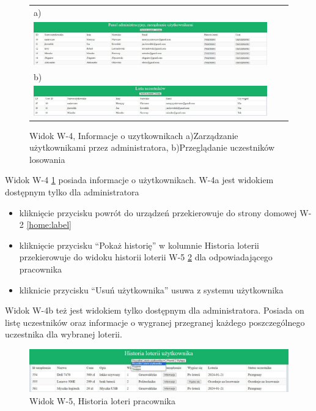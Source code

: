 \begin{figure}[htb]
  \centering
	\begin{tabular}{@{}lll@{}}
	a)\\
  \includegraphics[width=\textwidth]{rys05/view/manageUsers.pdf} \\
	
	b)\\
	\includegraphics[width=\textwidth]{rys05/view/participation.pdf} \\
	
	\end{tabular}
  \caption{Widok W-4, Informacje o uzytkownikach a)Zarządzanie użytkownikami przez administratora, b)Przeglądanie uczestników losowania}
  \label{manageUsers:label}
\end{figure}


Widok W-4 \ref{manageUsers:label} posiada informacje o użytkownikach. W-4a jest widokiem dostępnym tylko dla administratora
\begin{itemize}
	\item kliknięcie przycisku powrót do urządzeń przekierowuje do strony domowej W-2 \ref{home:label}
	\item kliknięcie przycisku "`Pokaż historię"' w kolumnie Historia loterii przekierowuje do widoku historii loterii  W-5 \ref{lotteryHistory:label} dla odpowiadającego pracownika
	\item kliknicie przycisku "`Usuń użytkownika"' usuwa z systemu użytkownika
\end{itemize}
Widok W-4b też jest widokiem tylko dostępnym dla administratora. Posiada on listę uczestników oraz informacje o wygranej przegranej każdego poszczególnego uczestnika dla wybranej loterii.\newline


\begin{figure}[h]
		\centering
    \includegraphics[width=\linewidth]{rys05/view/lotteryHistory.pdf}
    \caption{Widok W-5, Historia loteri pracownika}
    \label{lotteryHistory:label}
\end{figure}



